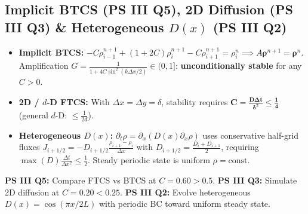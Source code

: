 \documentclass[10pt,a4paper]{article}
\begin{document}
\subsection{Implicit BTCS (PS III Q5), 2D Diffusion (PS III Q3) \& Heterogeneous $D(x)$ (PS III Q2)}
\begin{theorybox}
\begin{itemize}
\item \textbf{Implicit BTCS:} $-C\rho_{i-1}^{n+1} + (1+2C)\rho_i^{n+1} - C\rho_{i+1}^{n+1} = \rho_i^n \implies A\boldsymbol{\rho}^{n+1} = \boldsymbol{\rho}^n$. Amplification $G = \frac{1}{1+4C\sin^2(k\Delta x/2)} \in (0,1]$: \textbf{unconditionally stable} for any $C > 0$.
\item \textbf{2D / $d$-D FTCS:} With $\Delta x = \Delta y = \delta$, stability requires $\mathbf{C = \frac{D\Delta t}{\delta^2} \le \frac{1}{4}}$ (general $d$-D: $\le \frac{1}{2d}$).
\item \textbf{Heterogeneous $D(x)$:} $\partial_t\rho = \partial_x(D(x)\partial_x\rho)$ uses conservative half-grid fluxes $J_{i+1/2} = -D_{i+1/2}\frac{\rho_{i+1}-\rho_i}{\Delta x}$ with $D_{i+1/2} = \frac{D_i+D_{i+1}}{2}$, requiring $\max(D)\frac{\Delta t}{\Delta x^2} \le \frac{1}{2}$. Steady periodic state is uniform $\rho = \text{const}$.
\end{itemize}
\end{theorybox}

\begin{goalbox}
\textbf{PS III Q5:} Compare FTCS vs BTCS at $C = 0.60 > 0.5$. \textbf{PS III Q3:} Simulate 2D diffusion at $C = 0.20 < 0.25$. \textbf{PS III Q2:} Evolve heterogeneous $D(x)=\cos(\pi x/2L)$ with periodic BC toward uniform steady state.
\end{goalbox}
\end{document}
